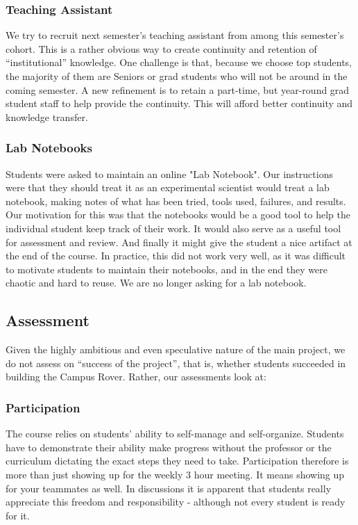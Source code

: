 \subsubsection{Teaching Assistant}We try to recruit next semester's teaching assistant from among this semester's cohort. This is a rather obvious way to create continuity and retention of ``institutional'' knowledge. One challenge is that, because we choose top students, the majority of them are Seniors or grad students who will not be around in the coming semester. A new refinement is to retain a part-time, but year-round grad student staff to help provide the continuity. This will afford better continuity and knowledge transfer.
\subsubsection{Lab Notebooks}Students were asked to maintain an online "Lab Notebook". Our instructions were that they should treat it as an experimental scientist would treat a lab notebook, making notes of what has been tried, tools used, failures, and results. Our motivation for this was that the notebooks would be a good tool to help the individual student keep track of their work. It would also serve as a useful tool for assessment and review. And finally it might give the student a nice artifact at the end of the course. In practice, this did not work very well, as it was difficult to motivate students to maintain their notebooks, and in the end they were chaotic and hard to reuse. We are no longer asking for a lab notebook.

\subsection{Assessment} Given the highly ambitious and even speculative nature of the main project, we do not assess on ``success of the project'', that is, whether students succeeded in building the Campus Rover. Rather, our assessments look at:

\subsubsection{Participation}
The course relies on students' ability to self-manage and self-organize. Students have to demonstrate their ability make progress without the professor or the curriculum dictating the exact steps they need to take. Participation therefore is more than just showing up for the weekly 3 hour meeting. It means showing up for your teammates as well. In discussions it is apparent that students really appreciate this freedom and responsibility - although not every student is ready for it.

